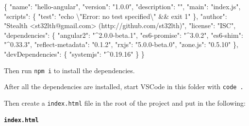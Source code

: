 \documentclass[12pt,]{article}
\newenvironment{Shaded}{}{}
\newcommand{\DataTypeTok}[1]{{#1}}
\newcommand{\CharTok}[1]{\textcolor[rgb]{0.00,0.50,0.50}{{#1}}}
\newcommand{\StringTok}[1]{\textcolor[rgb]{0.00,0.50,0.50}{{#1}}}
\newcommand{\FunctionTok}[1]{{#1}}
\begin{document}
\begin{Shaded}
\begin{Highlighting}[numbers=left,,]
\FunctionTok{\{}
  \DataTypeTok{"name"}\FunctionTok{:} \StringTok{"hello-angular"}\FunctionTok{,}
  \DataTypeTok{"version"}\FunctionTok{:} \StringTok{"1.0.0"}\FunctionTok{,}
  \DataTypeTok{"description"}\FunctionTok{:} \StringTok{""}\FunctionTok{,}
  \DataTypeTok{"main"}\FunctionTok{:} \StringTok{"index.js"}\FunctionTok{,}
  \DataTypeTok{"scripts"}\FunctionTok{:} \FunctionTok{\{}
    \DataTypeTok{"test"}\FunctionTok{:} \StringTok{"echo }\CharTok{\textbackslash{}"}\StringTok{Error: no test specified}\CharTok{\textbackslash{}"}\StringTok{ && exit 1"}
  \FunctionTok{\},}
  \DataTypeTok{"author"}\FunctionTok{:} \StringTok{"Stealth <st32lth@gmail.com> (http://github.com/st32lth)"}\FunctionTok{,}
  \DataTypeTok{"license"}\FunctionTok{:} \StringTok{"ISC"}\FunctionTok{,}
  \DataTypeTok{"dependencies"}\FunctionTok{:} \FunctionTok{\{}
    \DataTypeTok{"angular2"}\FunctionTok{:} \StringTok{"^2.0.0-beta.1"}\FunctionTok{,}
    \DataTypeTok{"es6-promise"}\FunctionTok{:} \StringTok{"^3.0.2"}\FunctionTok{,}
    \DataTypeTok{"es6-shim"}\FunctionTok{:} \StringTok{"^0.33.3"}\FunctionTok{,}
    \DataTypeTok{"reflect-metadata"}\FunctionTok{:} \StringTok{"0.1.2"}\FunctionTok{,}
    \DataTypeTok{"rxjs"}\FunctionTok{:} \StringTok{"5.0.0-beta.0"}\FunctionTok{,}
    \DataTypeTok{"zone.js"}\FunctionTok{:} \StringTok{"0.5.10"}
  \FunctionTok{\},}
  \DataTypeTok{"devDependencies"}\FunctionTok{:} \FunctionTok{\{}
    \DataTypeTok{"systemjs"}\FunctionTok{:} \StringTok{"^0.19.16"}
  \FunctionTok{\}}
\FunctionTok{\}}
\end{Highlighting}
\end{Shaded}

Then run \texttt{npm\ i} to install the dependencies.

After all the dependencies are installed, start VSCode in this folder
with \texttt{code\ .}

Then create a \texttt{index.html} file in the root of the project and
put in the following:

\textbf{\texttt{index.html}}
\end{document}
